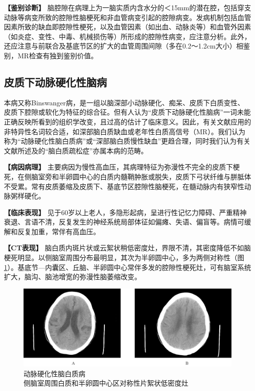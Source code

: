 \textbf{【鉴别诊断】}
脑腔隙在病理上为一脑实质内含水分的＜15mm的潜在腔，包括穿支动脉等病变所致的腔隙性脑梗死和非血管病变引起的腔隙病变。发病机制包括血管因素所致的缺血即腔隙性梗死，以及血管因素（如出血、动脉炎等）和血管外因素（如炎症、变性、中毒、机械损伤等）所形成的腔隙性病变，应注意分析。此外，还应注意与前联合及基底节区的扩大的血管周围间隙（多在0.2～1.2cm大小）相鉴别，MR检查有独到鉴别价值。

\subsection{皮质下动脉硬化性脑病}

本病又称Binswanger病，是一组以脑深部小动脉硬化、痴呆、皮质下白质变性、皮质下腔隙或软化为特征的综合征。但有人认为“皮质下动脉硬化性脑病”一词未能正确反映所看到的组织学改变，且过高的估计了临床意义。因此，有关文献应用的非特异性名词较合适，如深部脑白质缺血或老年性白质高信号（MR）。我们认为称为“动脉硬化性脑白质病”或“深部脑白质慢性缺血”更趋合理，同时我们认为有关文献所述及的“脑白质疏松症”亦属本病的范畴。

\textbf{【病因病理】}
主要病因为慢性高血压，其病理特征为弥漫性不完全的皮质下梗死，在侧脑室旁和半卵圆中心的白质内髓鞘肿胀或脱失，皮质下弓状纤维与胼胝体不受累。常有皮质萎缩及皮质下、基底节区腔隙性脑梗死，在髓动脉内有狭窄性动脉粥样硬化。

\textbf{【临床表现】}
见于60岁以上老人，多隐形起病，呈进行性记忆力障碍、严重精神衰退、言语不清，反复发生的神经系统局部体征如偏瘫、失语、偏盲等。病情可缓解和反复加重，常伴有高血压。

\textbf{【CT表现】}
脑白质内斑片状或云絮状稍低密度灶，界限不清，其密度降低不如脑梗死明显。以侧脑室周围分布最明显，其次为半卵圆中心，多为两侧对称性（图\ref{fig2-23}）。基底节---内囊区、丘脑、半卵圆中心常伴多发的腔隙性梗死灶，可有脑室系统扩大，脑沟、脑池增宽的弥漫性脑萎缩改变。

\begin{figure}[!htbp]
 \centering
 \includegraphics[width=.7\textwidth,height=\textheight,keepaspectratio]{./images/Image00041.jpg}
 \captionsetup{justification=centering}
 \caption{动脉硬化性脑白质病\\{\small 侧脑室周围白质和半卵圆中心区对称性片絮状低密度灶}}
 \label{fig2-23}
  \end{figure} 

